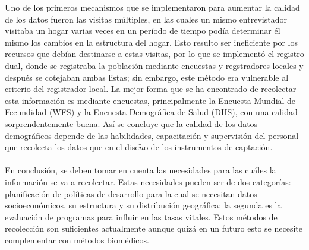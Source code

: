 \documentclass[11pt,spanish,letterpaper]{article}
\theoremstyle{plain}
\begin{document}
Uno de los primeros mecanismos que se implementaron para aumentar la calidad de los datos fueron las visitas m\'ultiples, en las cuales un mismo entrevistador visitaba un hogar varias veces en un per\'iodo de tiempo pod\'ia determinar \'el mismo los cambios en la estructura del hogar. Esto resulto ser ineficiente por los recursos que deb\'ian destinarse a estas visitas, por lo que se implement\'o el registro dual, donde se registraba la poblaci\'on mediante encuestas y regstradores locales y despu\'es se cotejaban ambas listas; sin embargo, este m\'etodo era vulnerable al criterio del registrador local. La mejor forma que se ha encontrado de recolectar esta informaci\'on es mediante encuestas, principalmente la Encuesta Mundial de Fecundidad (WFS) y la Encuesta Demogr\'afica de Salud (DHS), con una calidad sorprendentemente buena. As\'i se concluye que la calidad de los datos demogr\'aficos depende de las habilidades, capacitaci\'on y supervisi\'on del personal que recolecta los datos que en el dise$\tilde{n}$o de los instrumentos de captaci\'on.\\
\\
En conclusi\'on, se deben tomar en cuenta las necesidades para las cu\'ales la informaci\'on se va a recolectar. Estas necesidades pueden ser de dos categor\'ias: planificaci\'on de pol\'iticas de desarrollo para la cual se necesitan datos socioecon\'omicos, su estructura y su distribuci\'on geogr\'afica; la segunda es la evaluaci\'on de programas para influir en las tasas vitales. Estos m\'etodos de recolecci\'on son suficientes actualmente aunque quiz\'a en un futuro esto se necesite complementar con m\'etodos biom\'edicos.


\end{document}
